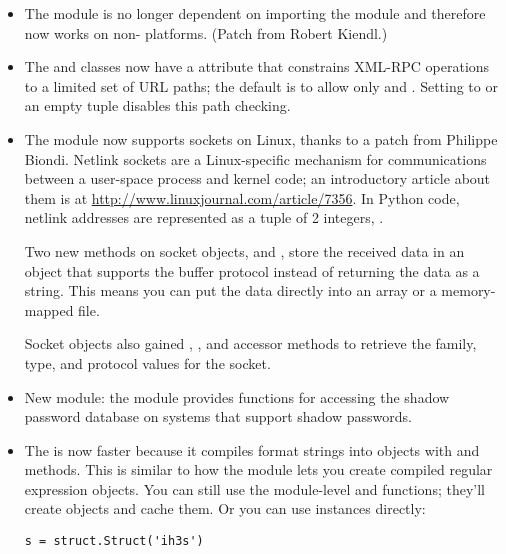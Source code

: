 \documentclass{howto}
\begin{document}
\begin{itemize}
\item The  module is no longer 
dependent on importing the  module and
therefore now works on non-{\UNIX} platforms.
(Patch from Robert Kiendl.)

\item The  and  
classes now have a  attribute that constrains
XML-RPC operations to a limited set of URL paths; the default is
to allow only  and .  Setting 
 to  or an empty tuple disables 
this path checking.

\item The  module now supports 
sockets on Linux, thanks to a patch from Philippe Biondi.  
Netlink sockets are a Linux-specific mechanism for communications
between a user-space process and kernel code; an introductory 
article about them is at \url{http://www.linuxjournal.com/article/7356}.
In Python code, netlink addresses are represented as a tuple of 2 integers, 
.

Two new methods on socket objects,  and
, store the received data in an object 
that supports the buffer protocol instead of returning the data as a
string.  This means you can put the data directly into an array or a
memory-mapped file.

Socket objects also gained , ,
and  accessor methods to retrieve the family, type,
and protocol values for the socket.

\item New module: the  module provides functions for
accessing the shadow password database on systems that support 
shadow passwords.

\item The  is now faster because it 
compiles format strings into  objects
with  and  methods.  This is similar
to how the  module lets you create compiled regular
expression objects.  You can still use the module-level 
 and  functions; they'll create 
 objects and cache them.  Or you can use 
 instances directly:

\begin{verbatim}
s = struct.Struct('ih3s')


\end{verbatim}
\end{itemize}
\end{document}
